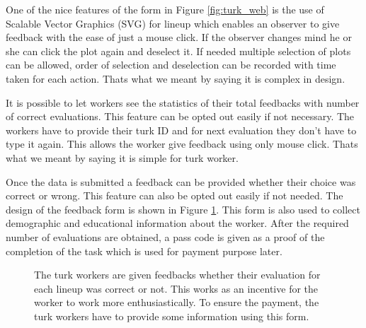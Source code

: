 \documentclass[11pt]{article}
\begin{document}
One of the nice features of the form in Figure \ref{fig:turk_web} is the use of Scalable Vector Graphics (SVG) for lineup which enables an observer to give feedback with the ease of just a mouse click. If the observer changes mind he or she can click the plot again and deselect it. If needed multiple selection of plots can be allowed, order of selection and deselection can be recorded with time taken for each action. Thats what we meant by saying it is complex in design. 

It is possible to let workers see the statistics of their total feedbacks with number of correct evaluations. This feature can be opted out easily if not necessary. The workers have to provide their turk ID and for next evaluation they don't have to type it again. This allows the worker give feedback using only mouse click. Thats what we meant by saying it is simple for turk worker.

Once the data is submitted a feedback can be provided whether their choice was correct or wrong. This feature can also be opted out easily if not needed. The design of the feedback form is shown in Figure \ref{fig:turk_web_feedback}. This form is also used to collect demographic and educational information about the worker. After the required number of evaluations are obtained, a pass code is given as a proof of the completion of the task which is used for payment purpose later.

\begin{figure}[hbtp]
   \centering
       \caption{The turk workers are given feedbacks whether their evaluation for each lineup was correct or not. This works as an incentive for the worker to work more enthusiastically. To ensure the payment, the turk workers have to provide some information using this form.}
       \label{fig:turk_web_feedback}
\end{figure}
\end{document}
